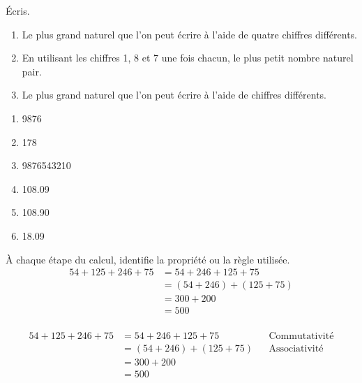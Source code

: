 \documentclass[../../syllabus_1.tex]{subfiles}
\begin{document}
\begin{exercise}
    Écris.
    \begin{enumerate}
        \item  Le plus grand naturel que l'on peut écrire à l'aide de quatre chiffres différents.
        \item  En utilisant les chiffres 1, 8 et 7 une fois chacun, le plus petit nombre naturel pair.
        \item  Le plus grand naturel que l'on peut écrire à l'aide de chiffres différents.
    \end{enumerate}
\end{exercise}
\begin{solution}
    \begin{enumerate}
        \item \num{9876}
        \item 178
        \item \num{9876543210}
        \item \num{108,09}
        \item \num{108,90}
        \item \num{18,09}
    \end{enumerate}
\end{solution}

\begin{exercise}
    À chaque étape du calcul, identifie la propriété ou la règle utilisée.
    \begin{align*}
        54 + 125 + 246 + 75
         & = 54 + 246 + 125 + 75     \\
         & = (54 + 246) + (125 + 75) \\
         & = 300 + 200               \\
         & = 500                     \\
    \end{align*}
\end{exercise}
\begin{solution}
    \begin{align*}
        54 + 125 + 246 + 75
         & = 54 + 246 + 125 + 75     &  & \text{Commutativité} \\
         & = (54 + 246) + (125 + 75) &  & \text{Associativité} \\
         & = 300 + 200                                         \\
         & = 500                                               \\
    \end{align*}
\end{solution}
\end{document}
